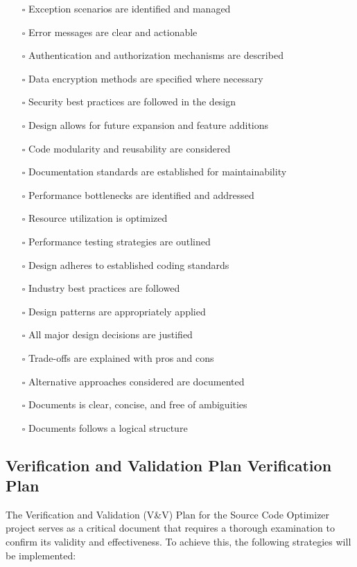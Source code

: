 \documentclass[12pt, titlepage]{article}
\begin{document}
\begin{itemize}
  \item[$\square$] Exception scenarios are identified and managed
  \item[$\square$] Error messages are clear and actionable
  \item[$\square$] Authentication and authorization mechanisms are described
  \item[$\square$] Data encryption methods are specified where necessary
  \item[$\square$] Security best practices are followed in the design
  \item[$\square$] Design allows for future expansion and feature additions
  \item[$\square$] Code modularity and reusability are considered
  \item[$\square$] Documentation standards are established for maintainability
  \item[$\square$] Performance bottlenecks are identified and addressed
  \item[$\square$] Resource utilization is optimized
  \item[$\square$] Performance testing strategies are outlined
  \item[$\square$] Design adheres to established coding standards
  \item[$\square$] Industry best practices are followed
  \item[$\square$] Design patterns are appropriately applied
  \item[$\square$] All major design decisions are justified
  \item[$\square$] Trade-offs are explained with pros and cons
  \item[$\square$] Alternative approaches considered are documented
  \item[$\square$] Documents is clear, concise, and free of ambiguities
  \item[$\square$] Documents follows a logical structure
\end{itemize}

\subsection{Verification and Validation Plan Verification Plan}

The Verification and Validation (V\&V) Plan for the Source Code
Optimizer project serves as a critical document that requires a
thorough examination to confirm its validity and effectiveness. To
achieve this, the following strategies will be implemented:
\end{document}
